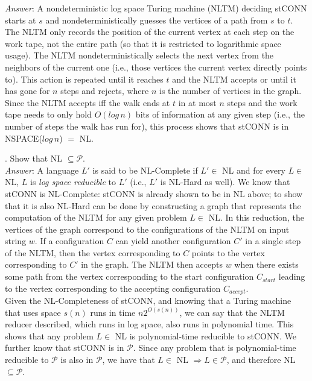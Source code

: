 \documentclass{scrartcl}
\begin{document}
    \noindent
    \textit{Answer}: A nondeterministic log space Turing machine (NLTM) deciding \textsf{stCONN}
    starts at $s$ and nondeterministically guesses the vertices of a path from $s$ to $t$. The NLTM
    only records the position of the current vertex at each step on the work tape, not the entire
    path (so that it is restricted to logarithmic space usage). The NLTM nondeterministically
    selects the next vertex from the neighbors of the current one (i.e., those vertices the current
    vertex directly points to). This action is repeated until it reaches $t$ and the NLTM accepts or
    until it has gone for $n$ steps and rejects, where $n$ is the number of vertices in the graph.
    Since the NLTM accepts iff the walk ends at $t$ in at most $n$ steps and the work tape needs to
    only hold $O(log\,n)$ bits of information at any given step (i.e., the number of steps the walk
    has run for), this process shows that \textsf{stCONN} is in \textsf{NSPACE($log\,n$) $=$ NL}.

    \newpage
    . Show that \textsf{NL} $\subseteq \mathcal{P}$.\\

    \noindent
    \textit{Answer}: A language $L'$ is said to be \textsf{NL}-Complete if $L' \in$ \textsf{NL} and
    for every $L \in$ \textsf{NL}, $L$ is \emph{log space reducible} to $L'$ (i.e., $L'$ is
    \textsf{NL}-Hard as well). We know that \textsf{stCONN} is \textsf{NL}-Complete: \textsf{stCONN}
    is already shown to be in \textsf{NL} above; to show that it is also \textsf{NL}-Hard can be
    done by constructing a graph that represents the computation of the NLTM for any given problem $
    L \in$ \textsf{NL}. In this reduction, the vertices of the graph correspond to the
    configurations of the NLTM on input string $w$. If a configuration $C$ can yield another
    configuration $C'$ in a single step of the NLTM, then the vertex corresponding to $C$ points to
    the vertex corresponding to $C'$ in the graph. The NLTM then accepts $w$ when there exists some
    path from the vertex corresponding to the start configuration $C_{start}$ leading to the vertex
    corresponding to the accepting configuration $C_{accept}$.\\

    \noindent
    Given the \textsf{NL}-Completeness of \textsf{stCONN}, and knowing that a Turing machine that
    uses space $s(n)$ runs in time $n2^{O(s(n))}$, we can say that the NLTM reducer described, which
    runs in log space, also runs in polynomial time. This shows that any problem $L \in$ \textsf{NL}
    is polynomial-time reducible to \textsf{stCONN}. We further know that \textsf{stCONN} is in
    $\mathcal{P}$. Since any problem that is polynomial-time reducible to $\mathcal{P}$ is also in
    $\mathcal{P}$, we have that $L \in$ \textsf{NL} $\Rightarrow L \in \mathcal{P}$, and therefore
    \textsf{NL} $\subseteq \mathcal{P}$.\\
\end{document}

